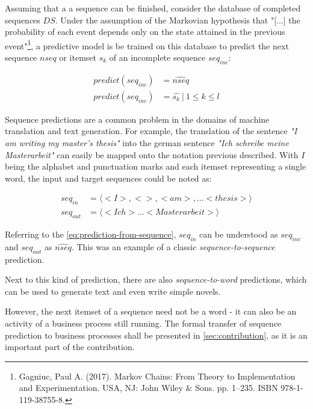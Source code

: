Assuming that a a sequence can be finished, consider the database of completed sequences $DS$. Under the assumption of the Markovian hypothesis that "[...] the probability of each event depends only on the state attained in the previous event"\footnote{Gagniuc, Paul A. (2017). Markov Chains: From Theory to Implementation and Experimentation. USA, NJ: John Wiley \& Sons. pp. 1–235. ISBN 978-1-119-38755-8.}, a predictive model is be trained on this database to predict the next sequence $nseq$ or itemset $s_k$ of an incomplete sequence $seq_{inc}$:

\begin{equation}
\begin{split}
    predict(seq_{inc}) &= \widehat{nseq}\\ predict(seq_{inc}) &= \hat{s_k}\ |\ 1 \leq k \leq l
\end{split}
\label{eq:prediction-from-sequence}
\end{equation}

Sequence predictions are a common problem in the domains of machine translation and text generation. For example, the translation of the sentence \textit{"I am writing my master's thesis"} into the german sentence \textit{"Ich schreibe meine Masterarbeit"} can easily be mapped onto the notation previous described. With $I$ being the alphabet and punctuation marks and each itemset representing a single word, the input and target sequences could be noted as:

\begin{equation*}
\begin{split}
seq_{in} &= \langle<I>, < >, <am>, ... <thesis>\rangle\\
seq_{out} &= \langle<Ich> ... <Masterarbeit>\rangle
\end{split}
\end{equation*}

Referring to the \autoref{eq:prediction-from-sequence}, $seq_{in}$ can be understood as $seq_{inc}$ and $seq_{out}$ as $\widehat{nseq}$. This was an example of a classic \textit{sequence-to-sequence} prediction.

Next to this kind of prediction, there are also \textit{sequence-to-word} predictions, which can be used to generate text and even write simple novels.

However, the next itemset of a sequence need not be a word - it can also be an activity of a business process still running. The formal transfer of sequence prediction to business processes shall be presented in \autoref{sec:contribution}, as it is an important part of the contribution.

